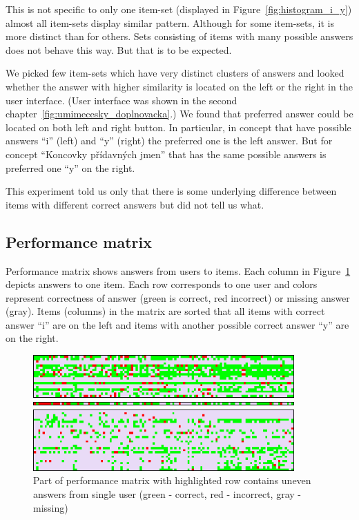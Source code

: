 \documentclass[
  printed, %
  table,   %
  nolof,     %
  nolot,     %
  color,
  final,
  nocover
]{fithesis3}
\begin{document}

This is not specific to only one item-set (displayed in Figure~\ref{fig:histogram_i_y}) almost all item-sets display similar pattern. Although for some item-sets, it is more distinct than for others. Sets consisting of items with many possible answers does not behave this way. But that is to be expected.

We picked few item-sets which have very distinct clusters of answers and looked whether the answer with higher similarity is located on the left or the right in the user interface. (User interface was shown in the second chapter~\ref{fig:umimecesky_doplnovacka}.) We found that preferred answer could be located on both left and right button. In particular, in concept \cviceniB{} that have possible answers ``i'' (left) and ``y'' (right) the preferred one is the left answer. But for concept ``Koncovky přídavných jmen'' that has the same possible answers is preferred one ``y'' on the right.

This experiment told us only that there is some underlying difference between items with different correct answers but did not tell us what.


\subsection{Performance matrix}\label{performance-matrix}

Performance matrix shows answers from users to items. Each column in Figure~\ref{fig:performance_matrix} depicts answers to one item. Each row corresponds to one user and colors represent correctness of answer (green is correct, red incorrect) or missing answer (gray). Items (columns) in the matrix are sorted that all items with correct answer ``i'' are on the left and items with another possible correct answer ``y'' are on the right.

\begin{figure}
  \includegraphics[width=10cm]{img/performance_matrix}
  \caption{Part of performance matrix with highlighted row contains uneven answers from single user (green - correct, red - incorrect, gray - missing)}
  \label{fig:performance_matrix}
\end{figure}
\end{document}
